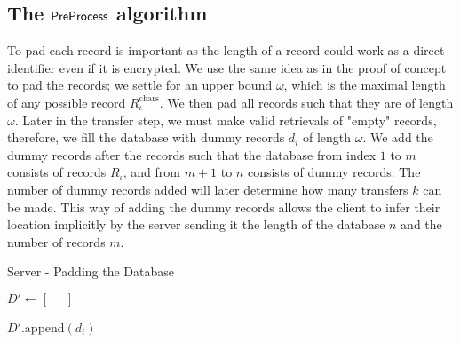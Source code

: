 \newcommand{\CTR}{\ensuremath{\mathsf{{CTR}}}}
\subsection*{\thesubsection\quad The $ \mathsf{{PreProcess}} $ algorithm}\label{subsec:PreProcessAlgorithm}

To pad each record is important as the length of a record could work as a direct identifier even if it is encrypted. We use the same idea as in the proof of concept to pad the records; we settle for an upper bound $ \omega $, which is the maximal length of any possible record $ R^{\mathrm{chars}}_{\iota} $. We then pad all records such that they are of length $ \omega $. Later in the transfer step, we must make valid retrievals of "empty" records, therefore, we fill the database with dummy records $ d_i $ of length $ \omega $. We add the dummy records after the records such that the database from index $ 1 $ to $ m $ consists of records $ R_{\iota} $, and from $ m + 1 $ to $ n $ consists of dummy records. The number of dummy records added will later determine how many transfers $ k $ can be made. This way of adding the dummy records allows the client to infer their location implicitly by the server sending it the length of the database $ n $ and the number of records $ m $.

\hfill

\begin{algorithm}[H]
    \LinesNumbered
    \caption{Server - Padding the Database}
    \label{algo:DatabasePadding}

    \vspace*{0.48cm}

    $ D' \gets \left[ \phantom{=}\right] $


     {
        
        $ D' $.append$ \left( d_i \right) $

    }

    \vspace*{0.48cm}

\end{algorithm}

